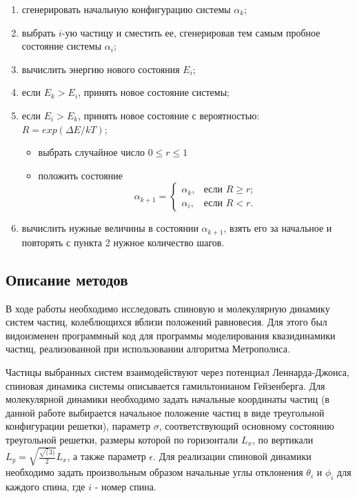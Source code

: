 \documentclass[14pt,a4paper,report]{ncc}
\begin{document}
\vspace{8mm}
\begin{enumerate}
\item сгенерировать начальную конфигурацию системы $\alpha_k$;
\item выбрать $i$-ую частицу и сместить ее, сгенерировав тем самым пробное состояние системы  $\alpha_i$;
\item вычислить энергию нового состояния $E_i$;
\item если $E_k>E_i$, принять новое состояние системы;
\item если $E_i>E_k$, принять новое состояние с вероятностью:\\
$R=exp(\Delta E/kT)$;
\begin{itemize}
\item выбрать случайное число $0\le r\le 1$
\item положить состояние 
\[
\alpha_{k+1}=
\begin{cases}
\alpha_k, & \text{если $R\ge r$;} \\
\alpha_i, & \text{если $R<r$.}
\end{cases}
\]
\end{itemize}
\item вычислить нужные величины в состоянии $\alpha_{k+1}$, взять его за начальное и повторять с пункта 2 нужное количество шагов.
\end{enumerate}



\subsection{Описание  методов}
В ходе работы необходимо исследовать спиновую и молекулярную динамику систем частиц, колеблющихся вблизи положений равновесия. Для этого был видоизменен программный код для программы моделирования квазидинамики частиц, реализованной при использовании алгоритма Метрополиса.
\

Частицы выбранных систем взаимодействуют через потенциал Леннарда-Джонса, спиновая динамика системы описывается гамильтонианом Гейзенберга. Для молекулярной динамики необходимо задать начальные координаты частиц (в данной работе выбирается начальное положение частиц в виде треугольной конфигурации решетки), параметр $\sigma$, соответствующий основному состоянию треугольной решетки, размеры которой по горизонтали $L_x$, по вертикали $L_y=\sqrt{\frac{\sqrt(3)}{2}}L_x$, а также параметр $\epsilon$. Для реализации спиновой динамики необходимо задать произвольным образом начальные углы отклонения $\theta_i$ и $\phi_i$ для каждого спина, где $i$ - номер спина.
\
\end{document}
